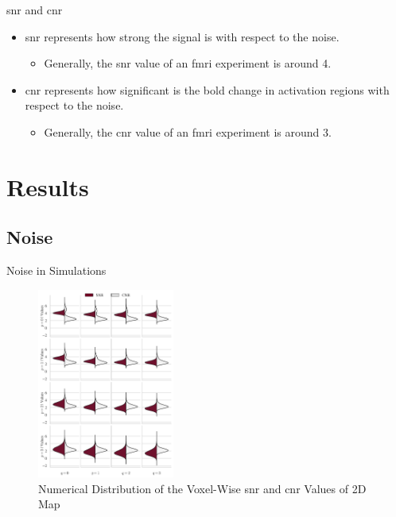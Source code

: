 \documentclass{beamer}
\begin{document}
\begin{frame}{\acrshort{snr} and \acrshort{cnr}}
\begin{itemize}
\item \acrfull{snr} represents how strong the signal is with respect to the noise.
\begin{itemize}
\item Generally, the \gls{snr} value of an \gls{fmri} experiment is around 4.
\end{itemize}
\item \acrfull{cnr} represents how significant is the \gls{bold} change in 
activation regions with respect to the noise.
\begin{itemize}
\item Generally, the \gls{cnr} value of an \gls{fmri} experiment is around 3.
\end{itemize}
\end{itemize}
\end{frame}

\section{Results}

\subsection{Noise}

\begin{frame}{Noise in Simulations}
\begin{figure}
\centering
\includegraphics[width=0.4\textwidth]{images/cnrsnr2D.png}
\caption{Numerical Distribution of the Voxel-Wise \gls{snr} and \gls{cnr} Values of 2D Map}
\end{figure}
\end{frame}
\end{document}
